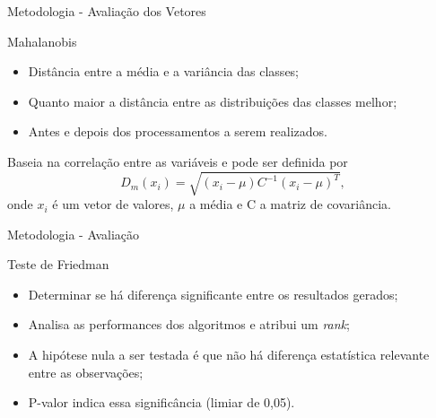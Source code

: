 \documentclass{beamer}
\begin{document}
\begin{frame}{Metodologia - Avaliação dos Vetores}
\justifying
\setlength\leftmargini{1em}
\begin{block}{Mahalanobis}  %

\begin{itemize}
\item Distância entre a média e a variância das classes;
\item Quanto maior a distância entre as distribuições das classes melhor;
\item Antes e depois dos processamentos a serem realizados.
\end{itemize}
\vspace{4pt}

Baseia na correlação entre as variáveis e pode ser definida por
\begin{equation*}
  D_m(x_i) = \sqrt{(x_i - \mu)C^{-1}(x_i-\mu)^T},
\end{equation*}
\noindent onde $x_i$ é um vetor de valores, $\mu$ a média e C a matriz de covariância.
\end{block}
\end{frame}
\begin{frame}{Metodologia - Avaliação}
\setlength\leftmargini{1em}
\begin{block}{Teste de Friedman}
\begin{itemize}
\item Determinar se há diferença significante entre os resultados gerados;
\item Analisa as performances dos algoritmos e atribui um \textit{rank};
\item A hipótese nula a ser testada é que não há diferença estatística relevante entre as observações;
\item P-valor indica essa significância (limiar de 0,05).
\end{itemize}
\end{block}
\end{frame}
\end{document}
